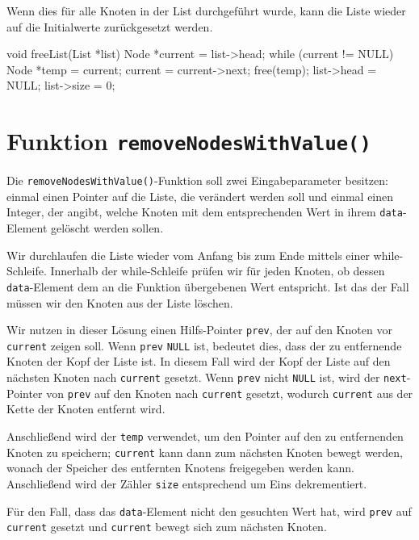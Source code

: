 Wenn dies für alle Knoten in der List durchgeführt wurde, kann die Liste wieder
auf die Initialwerte zurückgesetzt werden.

\begin{codebox}[lang=c, fontsize=\small]
void freeList(List *list) {
    Node *current = list->head;
    while (current != NULL) {
        Node *temp = current;
        current = current->next;
        free(temp);
    }
    list->head = NULL;
    list->size = 0;
}
\end{codebox}

\section*{Funktion \texttt{removeNodesWithValue()}}

Die \texttt{removeNodesWithValue()}-Funktion soll zwei Eingabeparameter
besitzen: einmal einen Pointer auf die Liste, die verändert werden soll und
einmal einen Integer, der angibt, welche Knoten mit dem entsprechenden Wert in
ihrem \texttt{data}-Element gelöscht werden sollen.

Wir durchlaufen die Liste wieder vom Anfang bis zum Ende mittels einer
while-Schleife. Innerhalb der while-Schleife prüfen wir für jeden Knoten, ob
dessen \texttt{data}-Element dem an die Funktion übergebenen Wert
entspricht. Ist das der Fall müssen wir den Knoten aus der Liste löschen.

Wir nutzen in dieser Lösung einen Hilfs-Pointer \texttt{prev}, der auf
den Knoten vor \texttt{current} zeigen soll. Wenn \texttt{prev}
\texttt{NULL} ist, bedeutet dies, dass der zu entfernende Knoten der Kopf
der Liste ist. In diesem Fall wird der Kopf der Liste auf den nächsten Knoten
nach \texttt{current} gesetzt. Wenn \texttt{prev} nicht
\texttt{NULL} ist, wird der \texttt{next}-Pointer von
\texttt{prev} auf den Knoten nach \texttt{current} gesetzt,
wodurch \texttt{current} aus der Kette der Knoten entfernt wird.

Anschließend wird der \texttt{temp} verwendet, um den Pointer auf den zu
entfernenden Knoten zu speichern; \texttt{current} kann dann zum nächsten
Knoten bewegt werden, wonach der Speicher des entfernten Knotens freigegeben
werden kann. Anschließend wird der Zähler \texttt{size} entsprechend um
Eins dekrementiert.

Für den Fall, dass das \texttt{data}-Element nicht den gesuchten Wert
hat, wird \texttt{prev} auf \texttt{current} gesetzt und
\texttt{current} bewegt sich zum nächsten Knoten.

